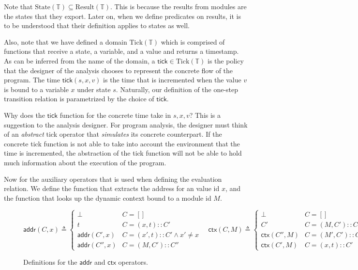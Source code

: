 \documentclass[acmsmall,review]{acmart}\settopmatter{printfolios=true,printccs=false,printacmref=false}
\theoremstyle{definition}
\newcommand*{\cons}{::}
\newcommand*{\Time}{\mathbb{T}}
\newcommand*{\State}{\text{State}}
\newcommand*{\Result}{\text{Result}}
\newcommand*{\Tick}{\text{Tick}}
\newcommand*{\addr}{\mathsf{addr}}
\newcommand*{\tick}{\mathsf{tick}}
\newcommand*{\modctx}{\mathsf{ctx}}
\begin{document}
Note that $\State(\Time)\subseteq\Result(\Time)$.
This is because the results from modules are the states that they export.
Later on, when we define predicates on results, it is to be understood that their definition applies to states as well.

Also, note that we have defined a domain $\Tick(\Time)$ which is comprised of functions that receive a state, a variable, and a value and returns a timestamp.
As can be inferred from the name of the domain, a $\tick\in\Tick(\Time)$ is the policy that the designer of the analysis chooses to represent the concrete flow of the program.
The time $\tick(s,x,v)$ is the time that is incremented when the value $v$ is bound to a variable $x$ under state $s$.
Naturally, our definition of the one-step transition relation is parametrized by the choice of $\tick$.

Why does the $\tick$ function for the concrete time take in $s, x, v$?
This is a suggestion to the analysis designer.
For program analysis, the designer must think of an \emph{abstract} tick operator that \emph{simulates} its concrete counterpart.
If the concrete tick function is not able to take into account the environment that the time is incremented, the abstraction of the tick function will not be able to hold much information about the execution of the program.

Now for the auxiliary operators that is used when defining the evaluation relation.
We define the function that extracts the address for an value id $x$,
and the function that looks up the dynamic context bound to a module id $M$.
\begin{figure}[h!]
  \centering
  \footnotesize
  \[
    \addr(C,x)\triangleq
    \begin{cases}
      \bot         & C=[]                              \\
      t            & C=(x, t)\cons C'                  \\
      \addr(C',x)  & C=(x', t)\cons C' \wedge x'\neq x \\
      \addr(C'',x) & C=(M, C')\cons C''
    \end{cases}
    \quad
    \modctx(C,M)\triangleq
    \begin{cases}
      \bot           & C=[]                               \\
      C'             & C=(M, C')\cons C''                 \\
      \modctx(C'',M) & C=(M', C')\cons C''\wedge M'\neq M \\
      \modctx(C',M)  & C=(x, t)\cons C'
    \end{cases}
  \]
  \caption{Definitions for the $\addr$ and $\modctx$ operators.}
\end{figure}
\end{document}
